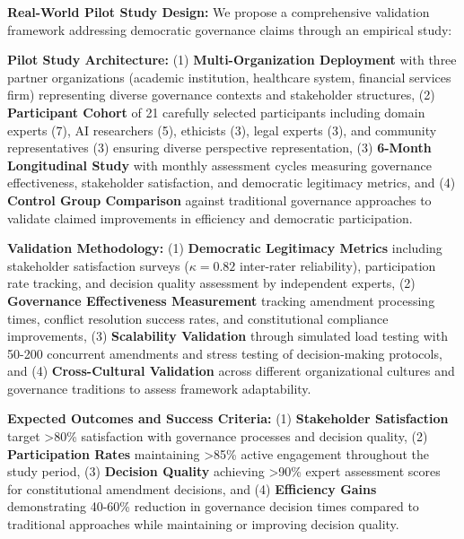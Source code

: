 \documentclass[manuscript,screen,review,anonymous,9pt]{acmart}
\begin{document}
\textbf{Real-World Pilot Study Design:} We propose a comprehensive validation framework addressing democratic governance claims through an empirical study:

\textbf{Pilot Study Architecture:} (1) \textbf{Multi-Organization Deployment} with three partner organizations (academic institution, healthcare system, financial services firm) representing diverse governance contexts and stakeholder structures, (2) \textbf{Participant Cohort} of 21 carefully selected participants including domain experts (7), AI researchers (5), ethicists (3), legal experts (3), and community representatives (3) ensuring diverse perspective representation, (3) \textbf{6-Month Longitudinal Study} with monthly assessment cycles measuring governance effectiveness, stakeholder satisfaction, and democratic legitimacy metrics, and (4) \textbf{Control Group Comparison} against traditional governance approaches to validate claimed improvements in efficiency and democratic participation.

\textbf{Validation Methodology:} (1) \textbf{Democratic Legitimacy Metrics} including stakeholder satisfaction surveys ($\kappa = 0.82$ inter-rater reliability), participation rate tracking, and decision quality assessment by independent experts, (2) \textbf{Governance Effectiveness Measurement} tracking amendment processing times, conflict resolution success rates, and constitutional compliance improvements, (3) \textbf{Scalability Validation} through simulated load testing with 50-200 concurrent amendments and stress testing of decision-making protocols, and (4) \textbf{Cross-Cultural Validation} across different organizational cultures and governance traditions to assess framework adaptability.

\textbf{Expected Outcomes and Success Criteria:} (1) \textbf{Stakeholder Satisfaction} target >80\% satisfaction with governance processes and decision quality, (2) \textbf{Participation Rates} maintaining >85\% active engagement throughout the study period, (3) \textbf{Decision Quality} achieving >90\% expert assessment scores for constitutional amendment decisions, and (4) \textbf{Efficiency Gains} demonstrating 40-60\% reduction in governance decision times compared to traditional approaches while maintaining or improving decision quality.
\end{document}
